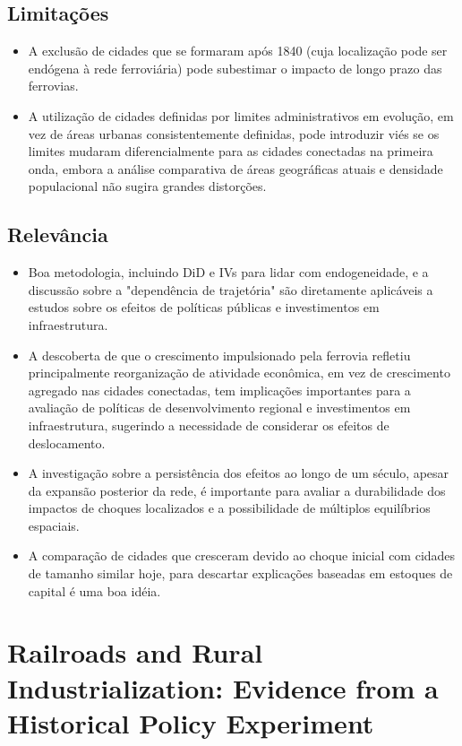 \documentclass[12pt]{article}
\begin{document}
\subsection*{Limitações}
\begin{itemize}
    \item A exclusão de cidades que se formaram após 1840 (cuja localização pode ser endógena à rede ferroviária) pode subestimar o impacto de longo prazo das ferrovias.
    \item A utilização de cidades definidas por limites administrativos em evolução, em vez de áreas urbanas consistentemente definidas, pode introduzir viés se os limites mudaram diferencialmente para as cidades conectadas na primeira onda, embora a análise comparativa de áreas geográficas atuais e densidade populacional não sugira grandes distorções.
\end{itemize}

\subsection*{Relevância}
\begin{itemize}
    \item Boa metodologia, incluindo DiD e IVs para lidar com endogeneidade, e a discussão sobre a "dependência de trajetória" são diretamente aplicáveis a estudos sobre os efeitos de políticas públicas e investimentos em infraestrutura.
    \item A descoberta de que o crescimento impulsionado pela ferrovia refletiu principalmente reorganização de atividade econômica, em vez de crescimento agregado nas cidades conectadas, tem implicações importantes para a avaliação de políticas de desenvolvimento regional e investimentos em infraestrutura, sugerindo a necessidade de considerar os efeitos de deslocamento.
    \item A investigação sobre a persistência dos efeitos ao longo de um século, apesar da expansão posterior da rede, é importante para avaliar a durabilidade dos impactos de choques localizados e a possibilidade de múltiplos equilíbrios espaciais.
    \item A comparação de cidades que cresceram devido ao choque inicial com cidades de tamanho similar hoje, para descartar explicações baseadas em estoques de capital é uma boa idéia.
\end{itemize}

\newpage
\section{Railroads and Rural Industrialization: Evidence from a Historical Policy Experiment}
\end{document}
